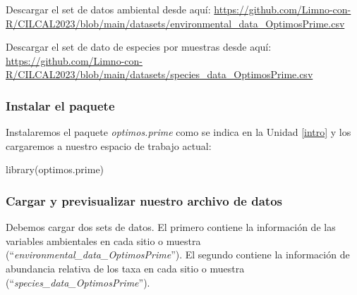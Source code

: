 \documentclass[
]{book}
\newenvironment{Shaded}{\begin{snugshade}}{\end{snugshade}}
\newcommand{\FunctionTok}[1]{\textcolor[rgb]{0.00,0.00,0.00}{#1}}
\newcommand{\NormalTok}[1]{#1}
\begin{document}
Descargar el set de datos ambiental desde aquí: \url{https://github.com/Limno-con-R/CILCAL2023/blob/main/datasets/environmental_data_OptimosPrime.csv}

Descargar el set de dato de especies por muestras desde aquí: \url{https://github.com/Limno-con-R/CILCAL2023/blob/main/datasets/species_data_OptimosPrime.csv}\\

\hypertarget{instalar-el-paquete-1}{%
\subsubsection{Instalar el paquete}\label{instalar-el-paquete-1}}

Instalaremos el paquete \emph{optimos.prime} \citep{sathicq2020} como se indica en la Unidad \ref{intro} y los cargaremos a nuestro espacio de trabajo actual:

\begin{Shaded}
\begin{Highlighting}[]
\FunctionTok{library}\NormalTok{(optimos.prime)}
\end{Highlighting}
\end{Shaded}

\hypertarget{cargar-y-previsualizar-nuestro-archivo-de-datos-1}{%
\subsubsection{Cargar y previsualizar nuestro archivo de datos}\label{cargar-y-previsualizar-nuestro-archivo-de-datos-1}}

Debemos cargar dos sets de datos. El primero contiene la información de las variables ambientales en cada sitio o muestra (``\emph{environmental\_data\_OptimosPrime}''). El segundo contiene la información de abundancia relativa de los taxa en cada sitio o muestra (``\emph{species\_data\_OptimosPrime}'').
\end{document}
